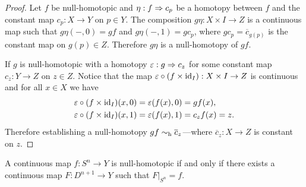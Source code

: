 \begin{proof}
    Let \(f\) be null-homotopic and \(\eta: f \Rightarrow c_p\) be a homotopy between \(f\)
    and the constant map \(c_p: X \to Y\) on \(p \in Y\). The composition
    \(g \eta: X \times I \to Z\) is a continuous map such that \(g\eta(-, 0) = g f\)
    and \(g \eta(-, 1) = g c_p\), where \(g c_p = \overline{c}_{g(p)}\) is the
    constant map on \(g(p) \in Z\). Therefore \(g \eta\) is a null-homotopy of
    \(gf\).

    If \(g\) is null-homotopic with a homotopy \(\varepsilon: g \Rightarrow c_z\) for some
    constant map \(c_z: Y \to Z\) on \(z \in Z\). Notice that the map
    \(\varepsilon \circ (f \times \operatorname{id}_I): X \times I \to Z\) is continuous and for
    all \(x \in X\) we have
    \begin{align*}
        \varepsilon\circ (f \times \operatorname{id}_I)(x, 0)
         & = \varepsilon(f(x), 0) = gf(x),        \\
        \varepsilon\circ (f \times \operatorname{id}_I)(x, 1)
         & = \varepsilon(f(x), 1) = c_z f(x) = z. \\
    \end{align*}
    Therefore establishing a null-homotopy \(g f \sim_{\text{h}} \overline{c}_z\)---where
    \(\overline{c}_z: X \to Z\) is constant on \(z\).
\end{proof}

\begin{proposition}
    \label{prop:map-from-Sn-is-null-homotopic}
    A continuous map \(f: S^n \to Y\) is null-homotopic if and only if there
    exists a continuous map \(F: D^{n+1} \to Y\) such that \(F|_{S^n} = f\).
\end{proposition}

